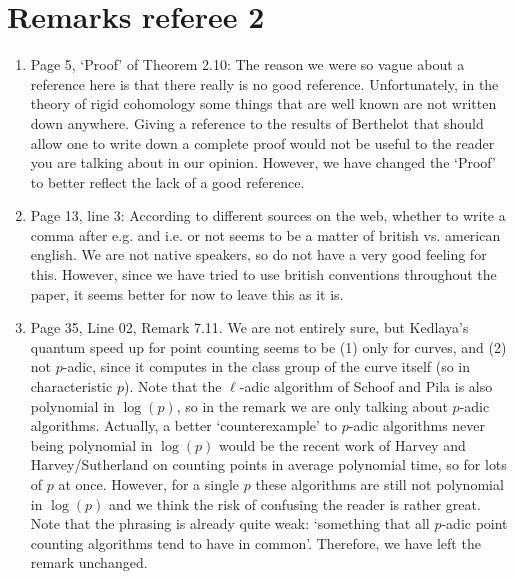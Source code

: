 \documentclass{article}
\begin{document}
\section*{Remarks referee 2}

\begin{enumerate}
\item Page 5, `Proof' of Theorem 2.10: The reason we were so vague about a reference here is that there really is no good reference. Unfortunately, in the theory of rigid cohomology some things that are well
known are not written down anywhere. Giving a reference to the results of Berthelot that should allow one to write down a complete proof would not be useful to the reader you 
are talking about in our opinion. However, we have changed the `Proof' to better reflect the lack of a good reference. 
\item Page 13, line 3: According to different sources on the web, whether to write a comma after e.g. and i.e. or not seems to be a matter of british vs. american english. We are not native speakers, so do not have a very good feeling 
for this. However, since we have tried to use british conventions throughout the paper, it seems better for now to leave this as it is.
\item Page 35, Line 02, Remark 7.11. We are not entirely sure, but Kedlaya's quantum speed up for point counting seems to be (1) only for curves, and (2) not $p$-adic, since it computes in the class group of the curve 
itself (so in characteristic $p$). Note that the $\ell$-adic algorithm of Schoof and Pila is also polynomial in $\log(p)$, so in the remark we are only talking about $p$-adic algorithms. Actually, a better `counterexample' to $p$-adic algorithms never being polynomial in $\log(p)$ would be the recent work of Harvey and Harvey/Sutherland on counting points 
in average polynomial time, so for lots of $p$ at once. However, for a single $p$ these algorithms are still not polynomial in $\log(p)$ and we think the risk of confusing the reader is rather great. Note that the 
phrasing is already quite weak: `something that all $p$-adic point counting algorithms tend to have in common'. Therefore, we have left the remark unchanged.
\end{enumerate}
\end{document}
